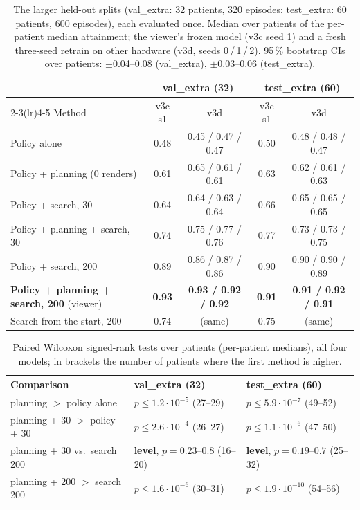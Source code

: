 \documentclass[12pt, a4paper]{book}
\begin{document}
\begin{table}[ht]
  \centering
  \small
  \caption[Results on 92 further held-out patients]{The larger held-out splits (val\_extra: 32 patients, 320 episodes; test\_extra: 60 patients, 600 episodes), each evaluated once. Median over patients of the per-patient median attainment; the viewer's frozen model (v3c seed 1) and a fresh three-seed retrain on other hardware (v3d, seeds 0\,/\,1\,/\,2). 95\,\% bootstrap CIs over patients: $\pm$0.04--0.08 (val\_extra), $\pm$0.03--0.06 (test\_extra).}
  \label{tab:eval-extra}
  \begin{tabular}{lcccc}
    \toprule
    & \multicolumn{2}{c}{val\_extra (32)} & \multicolumn{2}{c}{test\_extra (60)} \\
    \cmidrule(lr){2-3}\cmidrule(lr){4-5}
    Method & v3c s1 & v3d & v3c s1 & v3d \\
    \midrule
    Policy alone & 0.48 & 0.45 / 0.47 / 0.47 & 0.50 & 0.48 / 0.48 / 0.47 \\
    Policy + planning (0 renders) & 0.61 & 0.65 / 0.61 / 0.61 & 0.63 & 0.62 / 0.61 / 0.63 \\
    Policy + search, 30 & 0.64 & 0.64 / 0.63 / 0.64 & 0.66 & 0.65 / 0.65 / 0.65 \\
    Policy + planning + search, 30 & 0.74 & 0.75 / 0.77 / 0.76 & 0.77 & 0.73 / 0.73 / 0.75 \\
    Policy + search, 200 & 0.89 & 0.86 / 0.87 / 0.86 & 0.90 & 0.90 / 0.90 / 0.89 \\
    \textbf{Policy + planning + search, 200} (viewer) & \textbf{0.93} & \textbf{0.93 / 0.92 / 0.92} & \textbf{0.91} & \textbf{0.91 / 0.92 / 0.91} \\
    Search from the start, 200 & 0.74 & (same) & 0.75 & (same) \\
    \bottomrule
  \end{tabular}
\end{table}

\begin{table}[ht]
  \centering
  \small
  \caption[Significance tests on the larger splits]{Paired Wilcoxon signed-rank tests over patients (per-patient medians), all four models; in brackets the number of patients where the first method is higher.}
  \label{tab:eval-extra-tests}
  \begin{tabular}{lll}
    \toprule
    Comparison & val\_extra (32) & test\_extra (60) \\
    \midrule
    planning $>$ policy alone & $p \le 1.2\cdot10^{-5}$ (27--29) & $p \le 5.9\cdot10^{-7}$ (49--52) \\
    planning + 30 $>$ policy + 30 & $p \le 2.6\cdot10^{-4}$ (26--27) & $p \le 1.1\cdot10^{-6}$ (47--50) \\
    planning + 30 vs.\ search 200 & \textbf{level}, $p = 0.23$--$0.8$ (16--20) & \textbf{level}, $p = 0.19$--$0.7$ (25--32) \\
    planning + 200 $>$ search 200 & $p \le 1.6\cdot10^{-6}$ (30--31) & $p \le 1.9\cdot10^{-10}$ (54--56) \\
    \bottomrule
  \end{tabular}
\end{table}
\end{document}
